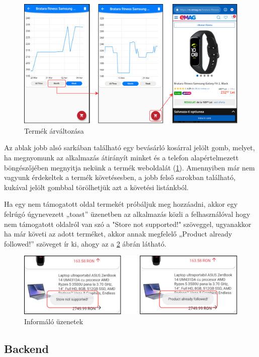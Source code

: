 \begin{figure}[H]
    \centering
    \includegraphics[scale=1]{figures/images/flutter_chart.png}
    \caption{Termék árváltozása}
    \label{fig:flutter_chart}
\end{figure}

Az ablak jobb alsó sarkában található egy bevásárló kosárral jelölt gomb, melyet, ha megnyomunk az alkalmazás átirányít minket és a telefon alapértelmezett böngészőjében megnyitja nekünk a termék weboldalát (\ref{fig:flutter_chart}). Amennyiben már nem vagyunk érdekeltek a termék követésesben, a jobb felső sarokban található, kukával jelölt gombbal törölhetjük azt a követési listánkból.

Ha egy nem támogatott oldal termekét próbáljuk meg hozzáadni, akkor egy felrúgó úgynevezett „toast” üzenetben az alkalmazás közli a felhasználóval hogy nem támogatott oldalról van szó a "Store not supported!" szöveggel, ugyanakkor ha már követi az adott terméket, akkor annak megfelelő „Product already followed!” szöveget ír ki, ahogy az a  \ref{fig:flutter_add_error} ábrán látható.

\begin{figure}[H]
    \centering
    \includegraphics[scale=1]{figures/images/flutter_add_error.png}
    \caption{Informáló üzenetek}
    \label{fig:flutter_add_error}
\end{figure}

\subsection{Backend}

